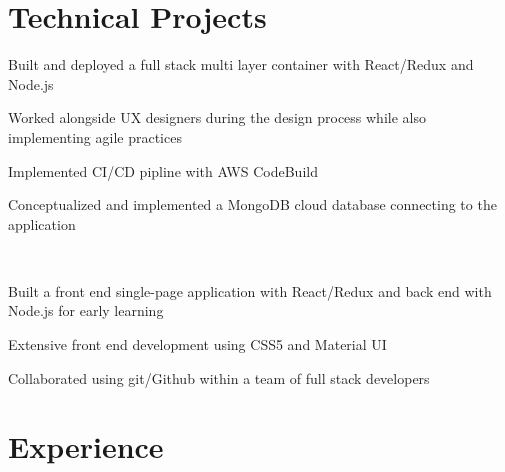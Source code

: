 \documentclass[]{deedy-resume-openfont}
\begin{document}
\begin{minipage}[t]{4in} 


\section{Technical Projects}
\vspace{\topsep} %
\begin{tightemize}
\item Built and deployed a full stack multi layer container with React/Redux and Node.js
\item Worked alongside UX designers during the design process while also implementing agile practices
\item Implemented CI/CD pipline with AWS CodeBuild
\item Conceptualized and implemented a MongoDB cloud database connecting to the application
\end{tightemize}
\sectionsep

 \\
\vspace{\topsep}
\begin{tightemize}
\item Built a front end single-page application with React/Redux and back end with Node.js for early learning \\
\item Extensive front end development using CSS5 and Material UI
\item Collaborated using git/Github within a team of full stack developers
\end{tightemize}
\sectionsep



\section{Experience}


\end{minipage}
\end{document}
